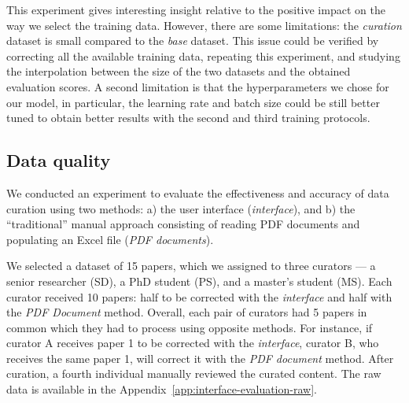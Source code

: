\documentclass[]{interact}
\theoremstyle{plain} %
\theoremstyle{definition}
\theoremstyle{remark}
\begin{document}

This experiment gives interesting insight relative to the positive impact on the way we select the training data. 
However, there are some limitations: the \emph{curation} dataset is small compared to the \emph{base} dataset. This issue could be verified by correcting all the available training data, repeating this experiment, and studying the interpolation between the size of the two datasets and the obtained evaluation scores. 
A second limitation is that the hyperparameters we chose for our model, in particular, the learning rate and batch size could be still better tuned to obtain better results with the second and third training protocols.


\subsection{Data quality}
\label{sec:interface-evaluation}
We conducted an experiment to evaluate the effectiveness and accuracy of data curation using two methods: a) the user interface (\textit{interface}), and b) the ``traditional'' manual approach consisting of reading PDF documents and populating an Excel file (\textit{PDF documents}).

We selected a dataset of 15 papers, which we assigned to three curators — a senior researcher (SD), a PhD student (PS), and a master's student (MS). 
Each curator received 10 papers: half to be corrected with the \textit{interface} and half with the \textit{PDF Document} method. 
Overall, each pair of curators had 5 papers in common which they had to process using opposite methods.
For instance, if curator A receives paper 1 to be corrected with the \textit{interface}, curator B, who receives the same paper 1, will correct it with the \textit{PDF document} method.
After curation, a fourth individual manually reviewed the curated content. The raw data is available in the Appendix~\ref{app:interface-evaluation-raw}.
\end{document}
